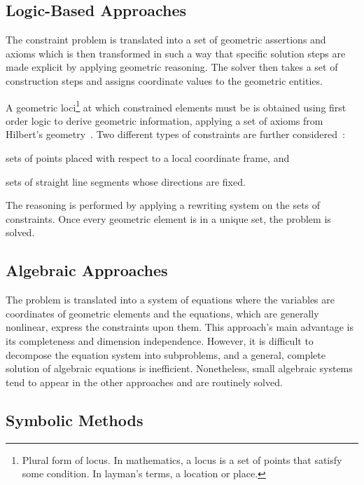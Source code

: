 \subsection{Logic-Based Approaches}%
\label{sec:intro.constraints.logic}

The constraint problem is translated into a set of geometric assertions and
axioms which is then transformed in such a way that specific solution steps are
made explicit by applying geometric reasoning.  The solver then takes a set of
construction steps and assigns coordinate values to the geometric entities.

A geometric loci\footnote{Plural form of locus.  In mathematics, a locus is a
set of points that satisfy some condition.  In layman's terms, a location or
place.} at which constrained elements must be is obtained using first order
logic to derive geometric information, applying a set of axioms from Hilbert's
geometry~\cite{Aldefeld:1988:VGBGRM,Bruderlin:1993:USGRRSGSS,Sohrt:1991:IC3DM}.
Two different types of constraints are further
considered~\cite{Sunde:1987:CADSDSS,Verroust:1992:RMPCAD}:
\begin{enumerate*}[label= (\arabic*)]
  \item sets of points placed with respect to a local coordinate frame, and
  \item sets of straight line segments whose directions are fixed.
\end{enumerate*}
The reasoning is performed by applying a rewriting system on the sets of
constraints.  Once every geometric element is in a unique set, the problem is
solved.

\subsection{Algebraic Approaches}%
\label{sec:intro.constraints.algebraic}

The problem is translated into a system of equations where the variables are
coordinates of geometric elements and the equations, which are generally
nonlinear, express the constraints upon them.  This approach's main advantage is
its completeness and dimension independence.  However, it is difficult to
decompose the equation system into subproblems, and a general, complete solution
of algebraic equations is inefficient.  Nonetheless, small algebraic systems
tend to appear in the other approaches and are routinely solved.

\subsection{Symbolic Methods}%
\label{sec:intro.constraints.symbolic}

